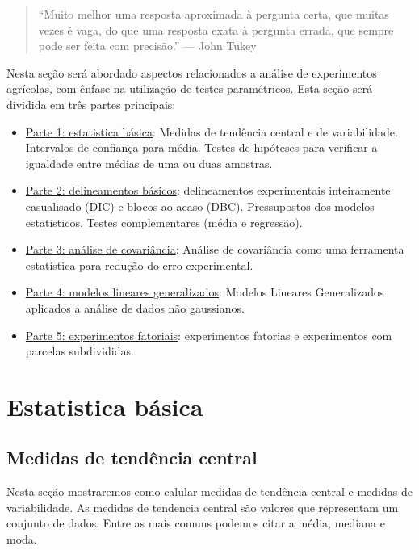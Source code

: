 \documentclass[
]{book}
\begin{document}
\begin{quote}
``Muito melhor uma resposta aproximada à pergunta certa, que muitas vezes é vaga, do que uma resposta exata à pergunta errada, que sempre pode ser feita com precisão.'' --- John Tukey
\end{quote}

Nesta seção será abordado aspectos relacionados a análise de experimentos agrícolas, com ênfase na utilização de testes paramétricos. Esta seção será dividida em três partes principais:

\begin{itemize}
\item
  \protect\hyperlink{ebasic}{Parte 1: estatistica básica}: Medidas de tendência central e de variabilidade. Intervalos de confiança para média. Testes de hipóteses para verificar a igualdade entre médias de uma ou duas amostras.
\item
  \protect\hyperlink{dbasic}{Parte 2: delineamentos básicos}: delineamentos experimentais inteiramente casualisado (DIC) e blocos ao acaso (DBC). Pressupostos  dos modelos estatisticos. Testes complementares (média e regressão).
\item
  \protect\hyperlink{ancova}{Parte 3: análise de covariância}: Análise de covariância como uma ferramenta estatística para redução do erro experimental.
\item
  \protect\hyperlink{general}{Parte 4: modelos lineares generalizados}: Modelos Lineares Generalizados aplicados a análise de dados não gaussianos.
\item
  \protect\hyperlink{efat}{Parte 5: experimentos fatoriais}: experimentos fatorias e experimentos com parcelas subdivididas.
\end{itemize}

\hypertarget{ebasic}{%
\section{Estatistica básica}\label{ebasic}}

\hypertarget{medidas-de-tenduxeancia-central}{%
\subsection{Medidas de tendência central}\label{medidas-de-tenduxeancia-central}}

Nesta seção mostraremos como calular medidas de tendência central e medidas de variabilidade. As medidas de tendencia central são valores que representam um conjunto de dados. Entre as mais comuns podemos citar a média, mediana e moda.
\end{document}
